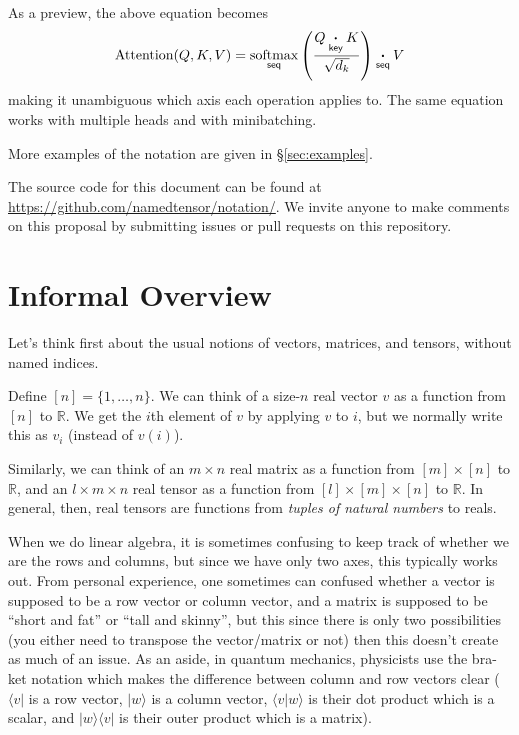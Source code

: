 \documentclass{article}
\begin{document}
As a preview, the above equation becomes
\begin{equation}
  \text{Attention}(Q,K,V) = \nfun{seq}{softmax} \left( \frac{Q \ndot{key} K}{\sqrt{d_k}} \right) \ndot{seq} V  
\label{eq:attention-new}
\end{equation}
making it unambiguous which axis each operation applies to. The same equation works with multiple heads and with minibatching.

More examples of the notation are given in \S\ref{sec:examples}.

The source code for this document can be found at \url{https://github.com/namedtensor/notation/}. We invite anyone to make comments on this proposal by submitting issues or pull requests on this repository.

\section{Informal Overview}
\label{sec:intro}

Let's think first about the usual notions of vectors, matrices, and tensors, without named indices.

Define $[n] = \{1, \ldots, n\}$. We can think of a size-$n$ real vector $v$ as a function from $[n]$ to $\mathbb{R}$. We get the $i$th element of $v$ by applying $v$ to $i$, but we normally write this as $v_i$ (instead of $v(i)$). 

Similarly, we can think of an $m \times n$ real matrix as a function from $[m] \times [n]$ to $\mathbb{R}$, and an $l \times m \times n$ real tensor as a function from $[l] \times [m] \times [n]$ to $\mathbb{R}$. In general, then, real tensors are functions from \emph{tuples of natural numbers} to reals.

When we do linear algebra, it is sometimes confusing to keep track of whether we are the rows and columns, but since we have only two axes, this typically works out.
From personal experience, one sometimes can confused whether a vector is supposed to be a row vector or column vector, and a matrix is supposed to be ``short and fat'' or ``tall and skinny'', but this since there is only two possibilities (you either need to transpose the vector/matrix or not) then this doesn't create as much of an issue. As an aside, in quantum mechanics, physicists use the bra-ket notation which makes the difference between column and row vectors clear ($\langle v |$ is a row vector, $| w \rangle$ is a column vector, $\langle v | w \rangle$ is their dot product which is a scalar, and $| w \rangle \langle v |$ is their outer product which is a matrix).
\end{document}
